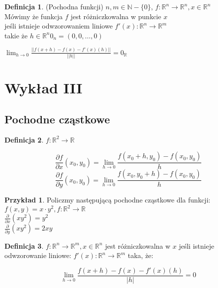 \documentclass{article}
\theoremstyle{definition}
\newtheorem{de}{Definicja}[subsection]
\theoremstyle{definition}
\theoremstyle{definition}
\newtheorem{pk}{Przykład}[subsection]
\theoremstyle{definition}
\begin{document}
\begin{de}
    (Pochodna funkcji) $n, m \in \mathbb{N}-\{0\}$, $f: \mathbb{R}^n \rightarrow \mathbb{R}^n, x \in \mathbb{R}^n$\\
    Mówimy że funkcja $f$ jest różniczkowalna w punkcie $x$\\
    jeśli istnieje odwzorowaniem liniowe $f'(x): \mathbb{R}^n \rightarrow \mathbb{R}^m$\\
    takie że $h\in\mathbb{R}^n 0_n = (0,0,\dots, 0)$

    \begin{center}
        $\lim_{h\rightarrow 0} \frac{||f(x+h)-f(x)-f'(x)(h)||}{||h||} = 0_{\mathbb{R}}$
    \end{center}
\end{de}


\section{Wykład III}

\subsection{Pochodne cząstkowe}

\begin{de}
$f: \mathbb{R}^2\rightarrow\mathbb{R}$
    \begin{center}
    \[\frac{\partial f}{\partial x} (x_0,y_0) = \lim_{h\rightarrow 0} \frac{f(x_0+h,y_0)-f(x_0,y_0)}{h}\]
    \[\frac{\partial f}{\partial y} (x_0,y_0) = \lim_{h\rightarrow 0} \frac{f(x_0,y_0+h)-f(x_0,y_0)}{h}\]
    \end{center}
\end{de}

\begin{pk}
    Policzmy następującą pochodne cząstkowe dla funkcji:\\
    $f(x,y)=x\cdot y^2, f: \mathbb{R}^2\rightarrow \mathbb{R}$\\
    $\frac{\partial}{\partial x} (xy^2) = y^2$\\
    $\frac{\partial}{\partial y} (xy^2) = 2xy$\\
\end{pk}

\begin{de}
    $f:\mathbb{R}^n \rightarrow \mathbb{R}^m, x \in \mathbb{R}^n$ jest różniczkowalna w $x$ jeśli istnieje odwzorowanie liniowe:
        $f'(x):\mathbb{R}^n\rightarrow\mathbb{R}^m$ taka, że:
    \begin{center}
        \[\lim_{h\rightarrow 0} \frac{f(x+h)-f(x)-f'(x)(h)}{|h|}=0\]
    \end{center}
\end{de}
\end{document}
